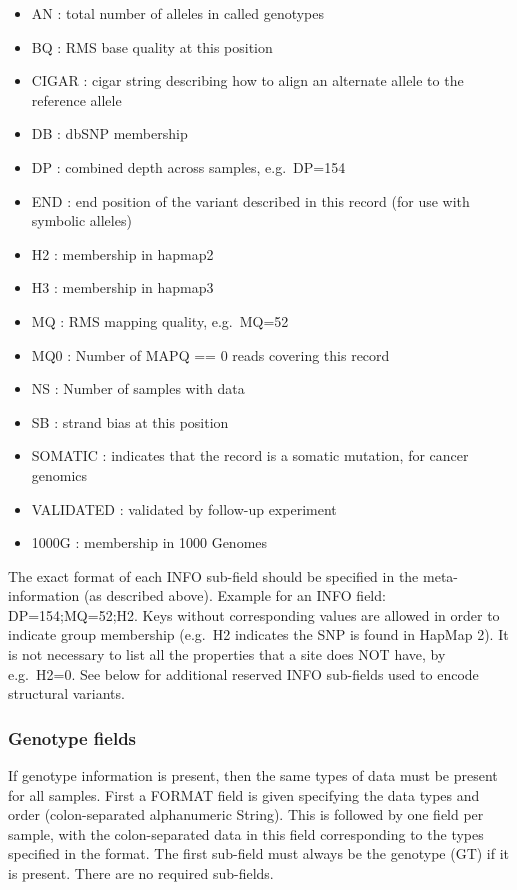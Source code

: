 \documentclass[8pt]{article}
\begin{document}
\begin{enumerate}
\begin{itemize}
  \item AN : total number of alleles in called genotypes
  \item BQ : RMS base quality at this position
  \item CIGAR : cigar string describing how to align an alternate allele to the reference allele
  \item DB : dbSNP membership
  \item DP : combined depth across samples, e.g.\ DP=154
  \item END : end position of the variant described in this record (for use with symbolic alleles)
  \item H2 : membership in hapmap2
  \item H3 : membership in hapmap3
  \item MQ : RMS mapping quality, e.g.\ MQ=52
  \item MQ0 : Number of MAPQ == 0 reads covering this record
  \item NS : Number of samples with data
  \item SB : strand bias at this position
  \item SOMATIC : indicates that the record is a somatic mutation, for cancer genomics
  \item VALIDATED : validated by follow-up experiment
  \item 1000G : membership in 1000 Genomes
\end{itemize}
\end{enumerate}
The exact format of each INFO sub-field should be specified in the meta-information (as described above).
Example for an INFO field: DP=154;MQ=52;H2. Keys without corresponding values are allowed in order to indicate group membership (e.g.\ H2 indicates the SNP is found in HapMap 2). It is not necessary to list all the properties that a site does NOT have, by e.g.\ H2=0. See below for additional reserved INFO sub-fields used to encode structural variants.
\subsubsection{Genotype fields}
If genotype information is present, then the same types of data must be present for all samples. First a FORMAT field is given specifying the data types and order (colon-separated alphanumeric String). This is followed by one field per sample, with the colon-separated data in this field corresponding to the types specified in the format. The first sub-field must always be the genotype (GT) if it is present.  There are no required sub-fields.
\end{document}
